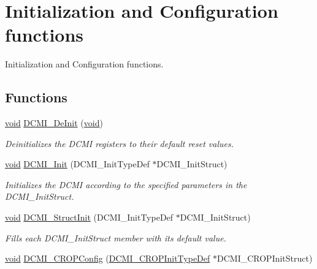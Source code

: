 \hypertarget{group___d_c_m_i___group1}{\section{Initialization and Configuration functions}
\label{group___d_c_m_i___group1}
}


Initialization and Configuration functions.  


\subsection*{Functions}
\begin{DoxyCompactItemize}
\item 
\hyperlink{group___n_a_m_e_ga18028b8badbf1ea7e704ccac3c488e82}{void} \hyperlink{group___d_c_m_i___group1_gab8f501f117d5695017e1dc5a611a5015}{D\-C\-M\-I\-\_\-\-De\-Init} (\hyperlink{group___n_a_m_e_ga18028b8badbf1ea7e704ccac3c488e82}{void})
\begin{DoxyCompactList}\small\item\em Deinitializes the D\-C\-M\-I registers to their default reset values. \end{DoxyCompactList}\item 
\hyperlink{group___n_a_m_e_ga18028b8badbf1ea7e704ccac3c488e82}{void} \hyperlink{group___d_c_m_i___group1_ga1299076f1459525053ba4f2fa408ed2a}{D\-C\-M\-I\-\_\-\-Init} (D\-C\-M\-I\-\_\-\-Init\-Type\-Def $\ast$D\-C\-M\-I\-\_\-\-Init\-Struct)
\begin{DoxyCompactList}\small\item\em Initializes the D\-C\-M\-I according to the specified parameters in the D\-C\-M\-I\-\_\-\-Init\-Struct. \end{DoxyCompactList}\item 
\hyperlink{group___n_a_m_e_ga18028b8badbf1ea7e704ccac3c488e82}{void} \hyperlink{group___d_c_m_i___group1_ga268eb4266fe7f294ee748e86f7b8add2}{D\-C\-M\-I\-\_\-\-Struct\-Init} (D\-C\-M\-I\-\_\-\-Init\-Type\-Def $\ast$D\-C\-M\-I\-\_\-\-Init\-Struct)
\begin{DoxyCompactList}\small\item\em Fills each D\-C\-M\-I\-\_\-\-Init\-Struct member with its default value. \end{DoxyCompactList}\item 
\hyperlink{group___n_a_m_e_ga18028b8badbf1ea7e704ccac3c488e82}{void} \hyperlink{group___d_c_m_i___group1_ga3bd4eb06314ed06dcb71ee91391b7ec4}{D\-C\-M\-I\-\_\-\-C\-R\-O\-P\-Config} (\hyperlink{struct_d_c_m_i___c_r_o_p_init_type_def}{D\-C\-M\-I\-\_\-\-C\-R\-O\-P\-Init\-Type\-Def} $\ast$D\-C\-M\-I\-\_\-\-C\-R\-O\-P\-Init\-Struct)

\end{DoxyCompactItemize}
